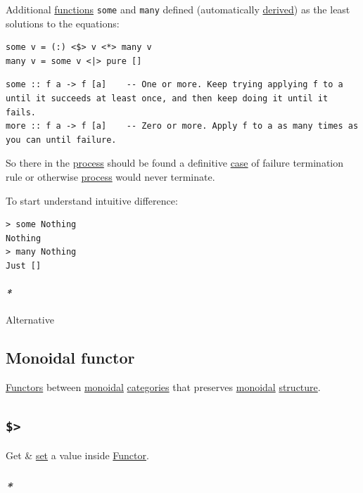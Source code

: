 \documentclass[a4paper,14pt,oneside]{book}
\begin{document}
Additional \hyperref[org196c7cc]{functions} \texttt{some} and \texttt{many} defined (automatically \hyperref[orge8d70a8]{derived}) as the least solutions to the equations:
\begin{verbatim}
some v = (:) <$> v <*> many v
many v = some v <|> pure []
\end{verbatim}

\begin{verbatim}
some :: f a -> f [a]    -- One or more. Keep trying applying f to a until it succeeds at least once, and then keep doing it until it fails.
more :: f a -> f [a]    -- Zero or more. Apply f to a as many times as you can until failure.
\end{verbatim}

So there in the \hyperref[org7aaca48]{process} should be found a definitive \hyperref[orgda48755]{case} of failure termination rule or otherwise \hyperref[org7aaca48]{process} would never terminate.

To start understand intuitive difference:
\begin{verbatim}
> some Nothing
Nothing
> many Nothing
Just []
\end{verbatim}

\paragraph{\emph{*}}
\label{sec:org88a89b0}

\label{org7d2ce94}Alternative

\subsection{\label{org92cb6bd}Monoidal functor}
\label{sec:org43ebb69}
\hyperref[org72adc60]{Functors} between \hyperref[orgf0a08a1]{monoidal} \hyperref[org1a0faa3]{categories} that preserves \hyperref[orgf0a08a1]{monoidal} \hyperref[org60f4b33]{structure}.

\subsection{\texttt{\$>}}
\label{sec:org94eebdd}
Get \& \hyperref[org6aef0c5]{set} a value inside \hyperref[orgbabb870]{Functor}.

\subsubsection{\emph{*}}
\label{sec:orgb0c822b}
\end{document}
